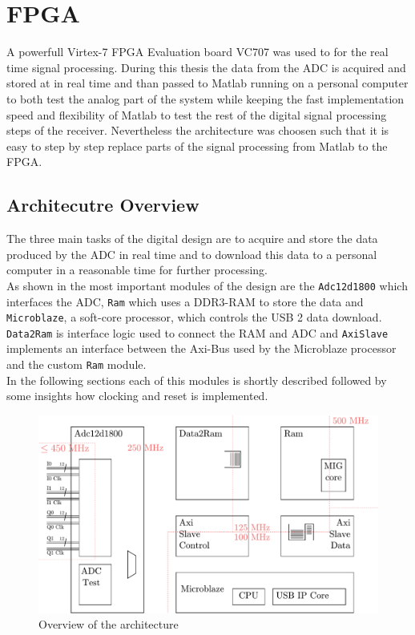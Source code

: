 \chapter{FPGA}
\label{chap:fpga}
A powerfull Virtex-7 \gls{FPGA} Evaluation board VC707
was used to for the real time signal processing.
During this thesis the data from the \gls{ADC} is acquired and stored at in real
time and than passed to Matlab running on a personal computer to both test
the analog part of the system while keeping the fast implementation speed
and flexibility of Matlab to test the rest of the digital signal processing steps
of the receiver. Nevertheless the architecture was choosen such that it is easy
to step by step replace parts of the signal processing from Matlab to the
\gls{FPGA}.

\section{Architecutre Overview}
The three main tasks of the digital design are to acquire and store the data
produced by the \gls{ADC} in real time and to download this data to a
personal computer in a reasonable time for further processing. \\

As shown in  the most important
modules of the design are the \verb|Adc12d1800| which interfaces the
\gls{ADC}, \verb|Ram| which uses a DDR3-\gls{RAM} to store the data
and \verb|Microblaze|, a soft-core processor, which controls the
\gls{USB} 2 data download. \verb|Data2Ram| is interface logic used
to connect the \gls{RAM} and \gls{ADC} and \verb|AxiSlave| implements
an interface between the Axi-Bus used by the Microblaze processor
and the custom \verb|Ram| module. \\

In the following sections each of this modules is shortly described followed
by some insights how clocking and reset is implemented.

\begin{figure}[ht]
  \centering
  \includegraphics[width=\textwidth]{figures/fpga_architecture_overview}
  \caption{Overview of the architecture}
  \label{fig:fpga_architecture_overview}
\end{figure}

